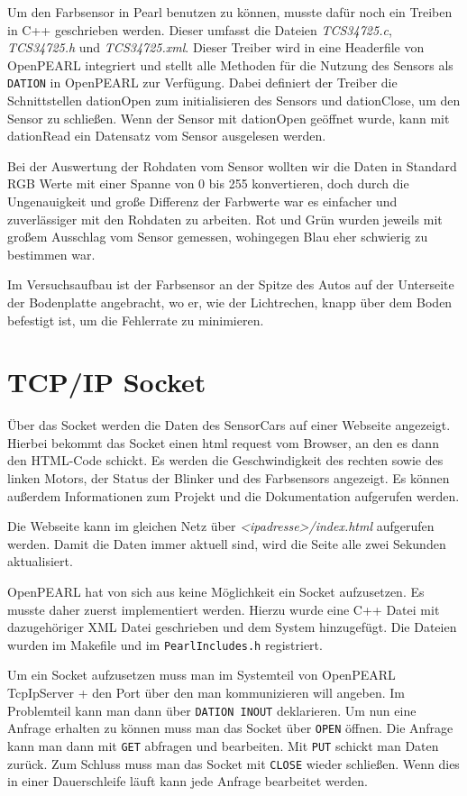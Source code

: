 Um den Farbsensor in Pearl benutzen zu können, musste dafür noch ein Treiben in C++ geschrieben werden. Dieser umfasst die Dateien \emph{TCS34725.c}, \emph{TCS34725.h} und \emph{TCS34725.xml}. Dieser Treiber wird in eine Headerfile von OpenPEARL integriert und stellt alle Methoden für die Nutzung des Sensors als \texttt{DATION} in OpenPEARL zur Verfügung. Dabei definiert der Treiber die Schnittstellen dationOpen zum initialisieren des Sensors und dationClose, um den Sensor zu schließen. Wenn der Sensor mit dationOpen geöffnet wurde, kann mit dationRead ein Datensatz vom Sensor ausgelesen werden. 

Bei der Auswertung der Rohdaten vom Sensor wollten wir die Daten in Standard RGB Werte mit einer Spanne von 0 bis 255 konvertieren, doch durch die Ungenauigkeit und große Differenz der Farbwerte war es einfacher und zuverlässiger mit den Rohdaten zu arbeiten. Rot und Grün wurden jeweils mit großem Ausschlag vom Sensor gemessen, wohingegen Blau eher schwierig zu bestimmen war.

Im Versuchsaufbau ist der Farbsensor an der Spitze des Autos auf der Unterseite der Bodenplatte angebracht, wo er, wie der Lichtrechen, knapp über dem Boden befestigt ist, um die Fehlerrate zu minimieren.

\section{TCP/IP Socket}
Über das Socket werden die Daten des SensorCars auf einer Webseite angezeigt. Hierbei bekommt das Socket einen html request vom Browser, an den es dann den HTML-Code schickt. Es werden die Geschwindigkeit des rechten sowie des linken Motors, der Status der Blinker und des Farbsensors angezeigt. Es können außerdem Informationen zum Projekt und die Dokumentation aufgerufen werden. 

Die Webseite kann im gleichen Netz über \emph{<ipadresse>/index.html} aufgerufen werden. Damit die Daten immer aktuell sind, wird die Seite alle zwei Sekunden aktualisiert.

OpenPEARL hat von sich aus keine Möglichkeit ein Socket aufzusetzen. Es musste daher zuerst implementiert werden. Hierzu wurde eine C++ Datei mit dazugehöriger XML Datei geschrieben und dem System hinzugefügt. Die Dateien wurden im Makefile und im \texttt{PearlIncludes.h} registriert. 

Um ein Socket aufzusetzen muss man im Systemteil von OpenPEARL TcpIpServer + den Port über den man kommunizieren will angeben. Im Problemteil kann man dann über \texttt{DATION INOUT} deklarieren. Um nun eine Anfrage erhalten zu können muss man das Socket über \texttt{OPEN} öffnen. Die Anfrage kann man dann mit \texttt{GET} abfragen und bearbeiten. Mit \texttt{PUT} schickt man Daten zurück. Zum Schluss muss man das Socket mit \texttt{CLOSE}  wieder schließen. Wenn dies in einer Dauerschleife läuft kann jede Anfrage bearbeitet werden. 
